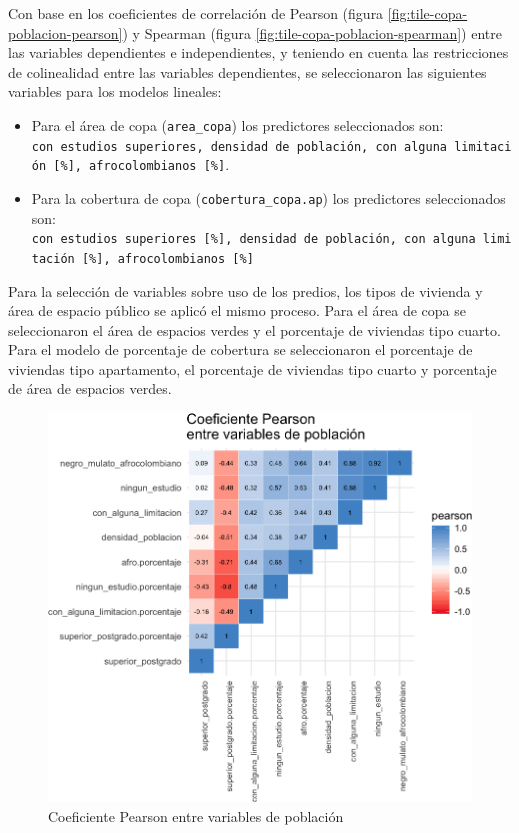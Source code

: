 \documentclass[12pt,a4paper,openany]{book}
\theoremstyle{definition}
\theoremstyle{definition}
\theoremstyle{definition}
\theoremstyle{remark}
\begin{document}
Con base en los coeficientes de correlación de Pearson (figura
\ref{fig:tile-copa-poblacion-pearson}) y Spearman (figura
\ref{fig:tile-copa-poblacion-spearman}) entre las variables dependientes
e independientes, y teniendo en cuenta las restricciones de colinealidad
entre las variables dependientes, se seleccionaron las siguientes
variables para los modelos lineales:

\begin{itemize}
\item
  Para el área de copa (\texttt{area\_copa}) los predictores
  seleccionados son:
  \texttt{con\ estudios\ superiores,\ densidad\ de\ población,\ con\ alguna\ limitación\ {[}\%{]},\ afrocolombianos\ {[}\%{]}}.
\item
  Para la cobertura de copa (\texttt{cobertura\_copa.ap}) los
  predictores seleccionados son:
  \texttt{con\ estudios\ superiores\ {[}\%{]},\ densidad\ de\ población,\ con\ alguna\ limitación\ {[}\%{]},\ afrocolombianos\ {[}\%{]}}
\end{itemize}

Para la selección de variables sobre uso de los predios, los tipos de
vivienda y área de espacio público se aplicó el mismo proceso. Para el
área de copa se seleccionaron el área de espacios verdes y el porcentaje
de viviendas tipo cuarto. Para el modelo de porcentaje de cobertura se
seleccionaron el porcentaje de viviendas tipo apartamento, el porcentaje
de viviendas tipo cuarto y porcentaje de área de espacios verdes.

\begin{figure}[H]

{\centering \includegraphics[width=1\linewidth]{tesis-unigis_files/figure-latex/tile-poblacion-pearson-1} 

}

\caption{Coeficiente Pearson entre variables de población}\label{fig:tile-poblacion-pearson}
\end{figure}
\end{document}
